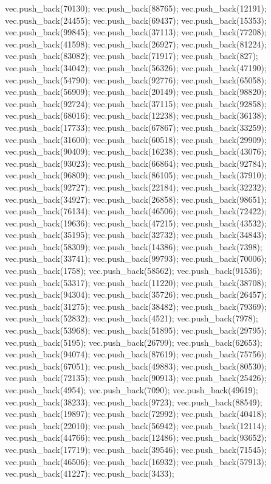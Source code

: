 vec.push_back(70130);
vec.push_back(88765);
vec.push_back(12191);
vec.push_back(24455);
vec.push_back(69437);
vec.push_back(15353);
vec.push_back(99845);
vec.push_back(37113);
vec.push_back(77208);
vec.push_back(41598);
vec.push_back(26927);
vec.push_back(81224);
vec.push_back(83082);
vec.push_back(71917);
vec.push_back(827);
vec.push_back(34042);
vec.push_back(56326);
vec.push_back(47190);
vec.push_back(54790);
vec.push_back(92776);
vec.push_back(65058);
vec.push_back(56909);
vec.push_back(20149);
vec.push_back(98820);
vec.push_back(92724);
vec.push_back(37115);
vec.push_back(92858);
vec.push_back(68016);
vec.push_back(12238);
vec.push_back(36138);
vec.push_back(17733);
vec.push_back(67867);
vec.push_back(33259);
vec.push_back(31600);
vec.push_back(60518);
vec.push_back(29909);
vec.push_back(90409);
vec.push_back(16238);
vec.push_back(43076);
vec.push_back(93023);
vec.push_back(66864);
vec.push_back(92784);
vec.push_back(96809);
vec.push_back(86105);
vec.push_back(37910);
vec.push_back(92727);
vec.push_back(22184);
vec.push_back(32232);
vec.push_back(34927);
vec.push_back(26858);
vec.push_back(98651);
vec.push_back(76134);
vec.push_back(46506);
vec.push_back(72422);
vec.push_back(19636);
vec.push_back(47215);
vec.push_back(43532);
vec.push_back(35195);
vec.push_back(32732);
vec.push_back(34843);
vec.push_back(58309);
vec.push_back(14386);
vec.push_back(7398);
vec.push_back(33741);
vec.push_back(99793);
vec.push_back(70006);
vec.push_back(1758);
vec.push_back(58562);
vec.push_back(91536);
vec.push_back(53317);
vec.push_back(11220);
vec.push_back(38708);
vec.push_back(94304);
vec.push_back(35726);
vec.push_back(26457);
vec.push_back(31275);
vec.push_back(38482);
vec.push_back(79369);
vec.push_back(52832);
vec.push_back(4521);
vec.push_back(7978);
vec.push_back(53968);
vec.push_back(51895);
vec.push_back(29795);
vec.push_back(5195);
vec.push_back(26799);
vec.push_back(62653);
vec.push_back(94074);
vec.push_back(87619);
vec.push_back(75756);
vec.push_back(67051);
vec.push_back(49883);
vec.push_back(80530);
vec.push_back(72135);
vec.push_back(90913);
vec.push_back(25426);
vec.push_back(4954);
vec.push_back(7090);
vec.push_back(49619);
vec.push_back(38233);
vec.push_back(9723);
vec.push_back(88549);
vec.push_back(19897);
vec.push_back(72992);
vec.push_back(40418);
vec.push_back(22010);
vec.push_back(56942);
vec.push_back(12114);
vec.push_back(44766);
vec.push_back(12486);
vec.push_back(93652);
vec.push_back(17719);
vec.push_back(39546);
vec.push_back(71545);
vec.push_back(46506);
vec.push_back(16932);
vec.push_back(57913);
vec.push_back(41227);
vec.push_back(3433);
